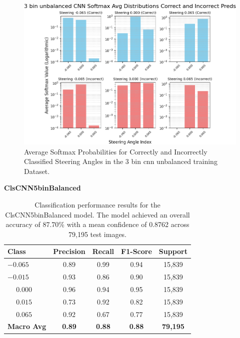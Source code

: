 \begin{figure}[H]
    \centering
    \includegraphics[width=1\linewidth]{Figures/Results/3_bins_cnn_softmax_dist_plot_unbalanced.png}
    \caption{Average Softmax Probabilities for Correctly and Incorrectly Classified Steering Angles in the 3 bin cnn unbalanced training Dataset.}
    \label{fig:3_bins_cnn_softmax_dist_unbalanced}
\end{figure}


\textbf{ClsCNN5binBalanced}

\begin{table}[htbp]
\centering
\begin{tabular}{@{}lcccc@{}}
\toprule
\textbf{Class} & \textbf{Precision} & \textbf{Recall} & \textbf{F1-Score} & \textbf{Support} \\
\midrule
$-0.065$ & 0.89 & 0.99 & 0.94 & 15,839 \\
$-0.015$ & 0.93 & 0.86 & 0.90 & 15,839 \\
$\phantom{-}0.000$ & 0.96 & 0.94 & 0.95 & 15,839 \\
$\phantom{-}0.015$ & 0.73 & 0.92 & 0.82 & 15,839 \\
$\phantom{-}0.065$ & 0.92 & 0.67 & 0.77 & 15,839 \\
\midrule
\textbf{Macro Avg} & \textbf{0.89} & \textbf{0.88} & \textbf{0.88} & \textbf{79,195} \\
\bottomrule
\end{tabular}
\caption{Classification performance results for the ClsCNN5binBalanced model. The model achieved an overall accuracy of 87.70\% with a mean confidence of 0.8762 across 79,195 test images.}
\label{tab:clf_report_ClsCNN5binBalanced}
\end{table}

